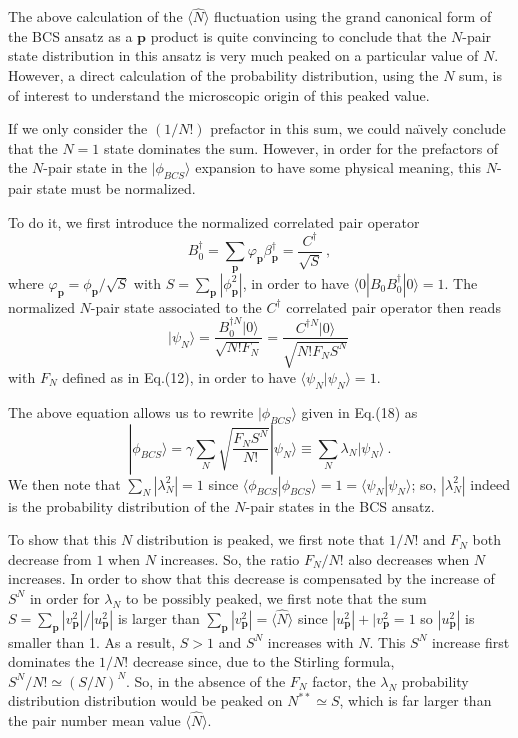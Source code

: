 \documentclass[twocolumn,showpacs]{revtex4}
\def\v#1{\mathbf{#1}}
\begin{document}
The above calculation of the $\langle\hat{N}\rangle$ fluctuation using the grand canonical form of the BCS ansatz as a $\v p$ product is quite convincing to conclude that the $N$-pair state distribution in this ansatz is very much peaked on a particular value of $N$. However, a direct calculation of the probability distribution, using the $N$ sum, is of interest to understand the microscopic origin of this peaked value.

If we only consider  the $(1/N!)$ prefactor in this sum, we could na\"{\i}vely conclude that the $N=1$ state dominates the sum. However, in order for the prefactors of the $N$-pair state in the $|\phi_{BCS}\rangle$ expansion to have some physical meaning, this $N$-pair state must be normalized.






 To do it, we first introduce the normalized correlated pair operator
\begin{equation}
B_0^\dag=\sum_{\v p}\varphi_{\v p}\beta_{\v p}^\dag=\frac{C^\dag}{\sqrt{S}}\ ,
\end{equation}
where $\varphi_{\v p}=\phi_{\v p}/\sqrt{S}$ with $S=\sum_{\v p}|\phi_{\v p}^2|$, in order to have $\langle 0|B_0B_0^\dag|0\rangle=1$. The normalized $N$-pair state associated to the $C^\dag$ correlated pair operator then reads
\begin{equation}
|\psi_N\rangle=\frac{B_0^{\dag N}|0\rangle}{\sqrt{N!F_N}}=\frac{C^{\dag N}|0\rangle}{\sqrt{N!F_NS^N}}\ 
\end{equation}
with $F_N$ defined as in Eq.(12), in order to have $\langle\psi_N|\psi_N\rangle=1$.

The above equation allows us to rewrite $|\phi_{BCS}\rangle$ given in Eq.(18) as
\begin{equation}\label{phiBCS}
|\phi_{BCS}\rangle=\gamma\sum_{N}\sqrt{\frac{F_NS^N}{N!}}|\psi_N\rangle
\equiv\sum_{N}\lambda_N|\psi_N\rangle\ .
\end{equation}
We then note that $\sum_N |\lambda_N^2|=1$ since $\langle\phi_{BCS}|\phi_{BCS}\rangle=1=\langle\psi_N|\psi_N\rangle$; so, $|\lambda_N^2|$ indeed is the probability distribution of the $N$-pair states in the BCS ansatz.

To show that this $N$ distribution is peaked, we first note that $1/N!$ and $F_N$ both decrease from $1$ when $N$ increases. So, the ratio $F_N/N!$ also decreases when $N$ increases. In order to show that this decrease is compensated by the increase of $S^N$ in order for $\lambda_N$ to be possibly peaked, we first note that the sum $S=\sum_{\v p}|v_{\v p}^2|/|u_{\v p}^2|$ is  larger than $\sum_{\v p}|v_{\v p}^2|=\langle\hat{N}\rangle$ since $|u_{\v p}^2|+|v_{\v p}^2=1$ so $|u_{\v p}^2|$ is smaller than 1. As a result, $S> 1$ and $S^N$ increases with $N$. This $S^N$ increase first dominates the $1/N!$ decrease  since, due to the Stirling formula, $S^N/N!\simeq(S/N)^N$. So, in the absence of the $F_N$ factor, the $\lambda_N$ probability distribution distribution would be peaked on $N^{\ast\ast}\simeq S$, which is far larger than the pair number mean value $\langle\hat{N}\rangle$.
\end{document}
